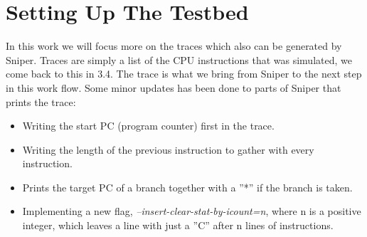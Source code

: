 \chapter{Setting Up The Testbed}
\label{chap:SettingUpTheTestbed}
In this work we will focus more on the traces which also can be generated by Sniper.
Traces are simply a list of the CPU instructions that was simulated, we come back
to this in 3.4. \fixme The trace is what we bring from Sniper to the next step in this work
flow. Some minor updates has been done to parts of Sniper that prints the trace:
\begin{itemize}
\item Writing the start PC (program counter) first in the trace.
\item Writing the length of the previous instruction to gather with every instruction.
\item Prints the target PC of a branch together with a ”*” if the branch is taken.
\item Implementing a new flag,\emph{ –insert-clear-stat-by-icount=n}, where n is a positive
integer, which leaves a line with just a ”C” after n lines of instructions.	
\end{itemize}

